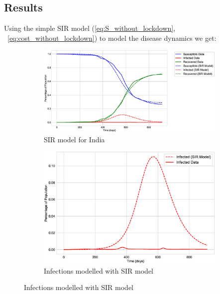 \documentclass[tikz,fleqn,12pt]{wlscirep}
\begin{document}
\subsection*{Results}
Using the simple SIR model (\ref{eq:S_without_lockdown}, ~\ref{eq:cost_without_lockdown}) to model the disease dynamics we get:
\begin{figure}[H]
  \centering
  \caption{SIR Model for India}
  \begin{subfigure}[t]{0.48\textwidth}
    \centering
    \includegraphics[width=\linewidth]{images/SIR_model_IND.eps}
    \caption{SIR model for India}
  \end{subfigure}
  \label{fig:SIR_model_IND}
  \hfill
  \begin{subfigure}[t]{0.48\textwidth}
    \centering
    \includegraphics[scale=0.25]{images/SIR_model_infections_IND.eps}
    \caption{Infections modelled with SIR model}
  \end{subfigure}
  \label{fig:SIR_model_infections_IND}
\end{figure}
\end{document}
